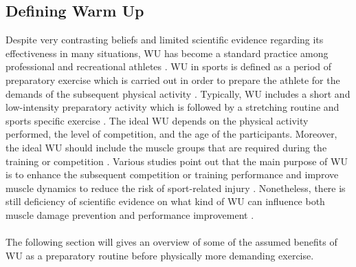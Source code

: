 \subsection{Defining Warm Up}
Despite very contrasting beliefs and limited scientific evidence regarding its effectiveness in many situations, WU has become a standard practice among professional and recreational athletes \cite{bishop2003warm1, bishop2003warm2, shellock1985warming}. WU in sports is defined as a period of preparatory exercise which is carried out in order to prepare the athlete for the demands of the subsequent physical activity  \cite{karvonen1992importance, woods2007warm, hedrick1992exercise}.
Typically, WU includes a short and low-intensity preparatory activity which is followed by a stretching routine and sports specific exercise \cite{safran1989warm}. 
The ideal WU depends on the physical activity performed,
the level of competition, and the age of the participants. Moreover, the ideal WU should include the muscle groups that are required during the training or competition
 \cite{mayr2015prevention}. Various studies point out that the main purpose of WU is to enhance the subsequent competition or training performance and improve muscle dynamics to reduce the risk of sport-related injury \cite{bishop2003warm1, shellock1985warming, knudson2008warm}. 
Nonetheless, there is still deficiency of scientific evidence on what kind of WU can influence both muscle damage prevention and performance improvement \cite{safran1989warm}.\\\\ The following section will gives an overview of some of the assumed benefits of WU as a preparatory routine before physically more demanding exercise. 
